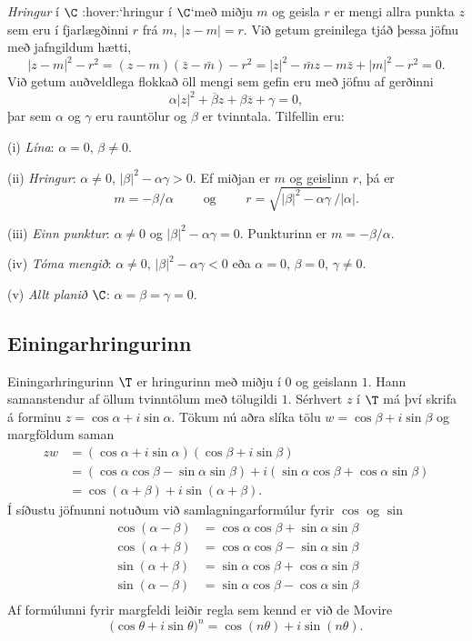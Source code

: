{\it Hringur } í $\C$ :hover:`hringur í $\C$`með miðju $m$ og geisla $r$ er mengi allra
punkta $z$ sem eru í fjarlægðinni $r$ frá $m$,
$|z-m|=r$. Við getum greinilega tjáð þessa jöfnu með jafngildum hætti,
 $$|z-m|^2-r^2=(z-m)(\bar z-\bar m)-r^2=|z|^2-\bar
mz-m\bar z +|m|^2-r^2=0.
 $$
Við getum auðveldlega flokkað öll mengi sem gefin eru með jöfnu af
gerðinni
 \begin{equation}\alpha|z|^2+\overline \beta z+\beta\overline z +\gamma=0,
 \end{equation}
þar sem $\alpha$ og $\gamma$ eru rauntölur og $\beta$ er tvinntala.
Tilfellin eru:

\noindent
(i) {\it Lína}:  $\alpha=0$, $\beta\neq 0$.

\noindent
(ii) {\it Hringur}:  $\alpha\neq 0$,
$|\beta|^2-{\alpha}\gamma>0$.  Ef miðjan er  $m$ og 
geislinn  $r$, þá er 
$$m=-\beta/\alpha\qquad \text{ og } \qquad
r=\sqrt{|\beta|^2-\alpha\gamma}\, /|\alpha|.
$$

\noindent
(iii)  {\it Einn punktur}: $\alpha\neq 0$ og
$|\beta|^2-\alpha\gamma=0$.   Punkturinn er
$m=-\beta/\alpha$. 

\noindent
(iv) {\it Tóma mengið}:  $\alpha\neq 0$,
$|\beta|^2-\alpha\gamma<0$ eða $\alpha=0$, $\beta=0$,
$\gamma\neq 0$.  

\noindent
(v) {\it Allt planið $\C$}:  $\alpha=\beta=\gamma=0$.


\subsection*{Einingarhringurinn}

Einingarhringurinn $\T$ er hringurinn með miðju í $0$
og geislann $1$.  Hann samanstendur af öllum tvinntölum 
með tölugildi $1$.  Sérhvert $z$ í $\T$  má því skrifa
á forminu  $z=\cos \alpha+i\sin \alpha$. 
Tökum nú aðra slíka tölu 
$w=\cos \beta+i\sin \beta$ og 
margföldum saman
\begin{align*}
zw&=(\cos \alpha +i\sin \alpha)(\cos \beta+i\sin \beta) \\
&=(\cos\alpha\cos\beta-\sin\alpha\sin\beta)+i(\sin\alpha\cos\beta+\cos
\alpha\sin\beta)\\
&=\cos(\alpha+\beta)+i\sin(\alpha+\beta). 
\end{align*}
Í síðustu jöfnunni notuðum við samlagningarformúlur fyrir $\cos$ og
$\sin$
\begin{align*}
\cos(\alpha-\beta) &=\cos \alpha \cos \beta +\sin \alpha \sin \beta \\
\cos(\alpha+\beta) &=\cos \alpha \cos \beta -\sin \alpha \sin \beta \\
\sin(\alpha+\beta) &=\sin \alpha \cos \beta + \cos \alpha \sin \beta \\
\sin(\alpha-\beta) &=\sin \alpha \cos \beta - \cos \alpha \sin \beta \\
\end{align*}
Af  formúlunni fyrir margfeldi leiðir regla sem kennd er 
við de Movire
$$
\big(\cos\theta+i\sin\theta\big)^n
=\cos(n\theta)+i\sin(n\theta).
$$

